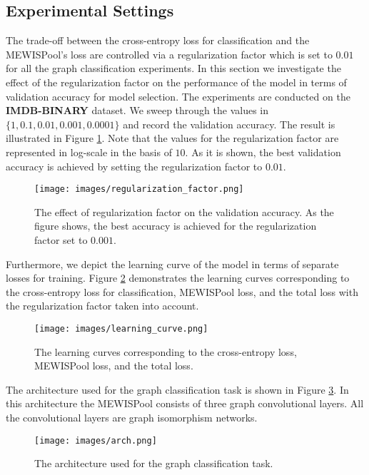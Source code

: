 \documentclass{article}
\begin{document}
\subsection{Experimental Settings}

The trade-off between the cross-entropy loss for classification and the MEWISPool’s loss are controlled via a regularization factor which is set to $0.01$ for all the graph classification experiments. In this section we investigate the effect of the regularization factor on the performance of the model in terms of validation accuracy for model selection. The experiments are conducted on the \textbf{IMDB-BINARY} dataset. We sweep through the values in $\{1,0.1,0.01,0.001,0.0001\}$ and record the validation accuracy. The result is illustrated in Figure \ref{fig:reg-fac}. Note that the values for the regularization factor are represented in log-scale in the basis of $10$.  As it is shown, the best validation accuracy is achieved by setting the regularization factor to $0.01$.
\begin{figure}[!ht]
	\begin{center}
		\texttt{[image: images/regularization\_factor.png]}
		\caption{The effect of regularization factor on the validation accuracy. As the figure shows, the best accuracy is achieved for the regularization factor set to $0.001$.}
		\label{fig:reg-fac}
	\end{center}
\end{figure}

Furthermore, we depict the learning curve of the model in terms of separate losses for training. Figure \ref{fig:learn-curve} demonstrates the learning curves corresponding to the cross-entropy loss for classification, MEWISPool loss, and the total loss with the regularization factor taken into account.
\begin{figure}[!ht]
	\begin{center}
		\texttt{[image: images/learning\_curve.png]}
		\caption{The learning curves corresponding to the cross-entropy loss, MEWISPool loss, and the total loss.}
		\label{fig:learn-curve}
	\end{center}
\end{figure}
The architecture used for the graph classification task is shown in Figure \ref{fig:arch}. In this architecture the MEWISPool consists of three graph convolutional layers. All the convolutional layers are graph isomorphism networks.
\begin{figure}[!ht]
	\begin{center}
		\texttt{[image: images/arch.png]}
		\caption{The architecture used for the graph classification task.}
		\label{fig:arch}
	\end{center}
\end{figure}
\end{document}
